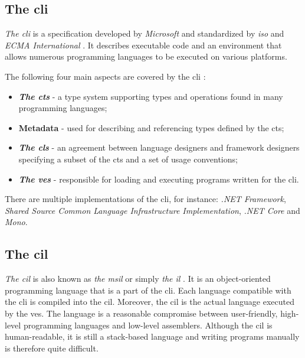 \documentclass{article}
\numberwithin{equation}{section}
\begin{document}
\subsection{The \acrlong{cli}}

\textit{The \acrfull{cli}} is a specification developed by \textit{Microsoft} and standardized by \textit{\acrshort{iso}} and \textit{ECMA International} \cite{isoStandard, ecmaStandard}. It describes executable code and an environment that allows numerous programming languages to be executed on various platforms.

The following four main aspects are covered by the \acrlong{cli} \cite{ecmaStandard}:
\begin{itemize}
	\item{
		\textbf{\textit{The \acrfull{cts}}} - a type system supporting types and operations found in many programming languages;
	}
	\item{
		\textbf{Metadata} - used for describing and referencing types defined by the \acrshort{cts};
	}
	\item{
		\textbf{\textit{The \acrfull{cls}}} - an agreement between language designers and framework designers specifying a subset of the \acrshort{cts} and a set of usage conventions;
	}
	\item{
		\textbf{\textit{The \acrfull{ves}}} - responsible for loading and executing programs written for the \acrshort{cli}.
	}
\end{itemize}

There are multiple implementations of the \acrshort{cli}, for instance: \textit{.NET Framework}, \textit{Shared Source Common Language Infrastructure Implementation}, \textit{.NET Core} and \textit{Mono}.

\subsection{The \acrlong{cil}}

\textit{The \acrfull{cil}} is also known as \textit{the \acrfull{msil}} or simply \textit{the \acrfull{il}} \cite{procsharp7}. It is an object-oriented programming language that is a part of the \acrshort{cli}. Each language compatible with the \acrshort{cli} is compiled into the \acrshort{cil}. Moreover, the \acrshort{cil} is the actual language executed by the \acrshort{ves}. The language is a reasonable compromise between user-friendly, high-level programming languages and low-level assemblers. Although the \acrshort{cil} is human-readable, it is still a stack-based language and writing programs manually is therefore quite difficult.
\end{document}
